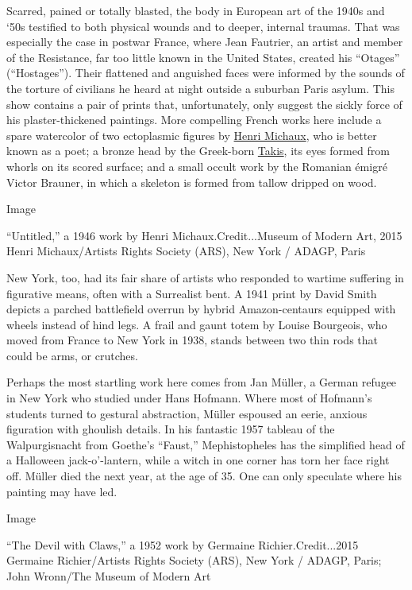 Scarred, pained or totally blasted, the body in European art of the
1940s and `50s testified to both physical wounds and to deeper, internal
traumas. That was especially the case in postwar France, where Jean
Fautrier, an artist and member of the Resistance, far too little known
in the United States, created his ``Otages'' (``Hostages''). Their
flattened and anguished faces were informed by the sounds of the torture
of civilians he heard at night outside a suburban Paris asylum. This
show contains a pair of prints that, unfortunately, only suggest the
sickly force of his plaster-thickened paintings. More compelling French
works here include a spare watercolor of two ectoplasmic figures by
\href{http://www.theguardian.com/books/2002/aug/10/featuresreviews.guardianreview18}{Henri
Michaux}, who is better known as a poet; a bronze head by the Greek-born
\href{http://www.wsj.com/articles/sculptor-takis-bends-natures-laws-for-art-1424374561}{Takis},
its eyes formed from whorls on its scored surface; and a small occult
work by the Romanian émigré Victor Brauner, in which a skeleton is
formed from tallow dripped on wood.

Image

``Untitled,'' a 1946 work by Henri Michaux.Credit...Museum of Modern
Art, 2015 Henri Michaux/Artists Rights Society (ARS), New York / ADAGP,
Paris

New York, too, had its fair share of artists who responded to wartime
suffering in figurative means, often with a Surrealist bent. A 1941
print by David Smith depicts a parched battlefield overrun by hybrid
Amazon-centaurs equipped with wheels instead of hind legs. A frail and
gaunt totem by Louise Bourgeois, who moved from France to New York in
1938, stands between two thin rods that could be arms, or crutches.

Perhaps the most startling work here comes from Jan Müller, a German
refugee in New York who studied under Hans Hofmann. Where most of
Hofmann's students turned to gestural abstraction, Müller espoused an
eerie, anxious figuration with ghoulish details. In his fantastic 1957
tableau of the Walpurgisnacht from Goethe's ``Faust,'' Mephistopheles
has the simplified head of a Halloween jack-o'-lantern, while a witch in
one corner has torn her face right off. Müller died the next year, at
the age of 35. One can only speculate where his painting may have led.

Image

``The Devil with Claws,'' a 1952 work by Germaine Richier.Credit...2015
Germaine Richier/Artists Rights Society (ARS), New York / ADAGP, Paris;
John Wronn/The Museum of Modern Art

